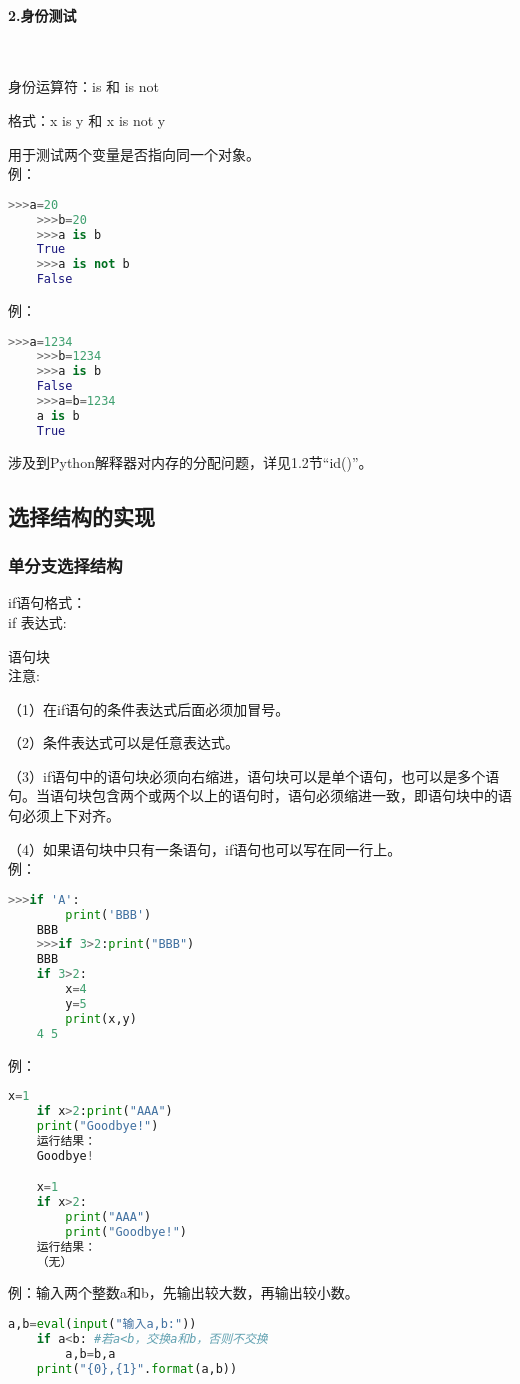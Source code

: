 \documentclass[11pt,a4paper]{article}
\begin{document}
\paragraph{2.身份测试}~{}

身份运算符：is 和 is not

格式：x is y 和 x is not y

用于测试两个变量是否指向同一个对象。\\
例：
\begin{lstlisting}[language={Python}]
    >>>a=20
    >>>b=20
    >>>a is b
    True
    >>>a is not b
    False
\end{lstlisting}
例：
\begin{lstlisting}[language={Python}]
    >>>a=1234
    >>>b=1234
    >>>a is b
    False
    >>>a=b=1234
    a is b
    True
\end{lstlisting}
涉及到Python解释器对内存的分配问题，详见1.2节“id()”。

\subsection{选择结构的实现}

\subsubsection{单分支选择结构}

if语句格式：\\
if 表达式:

语句块\\
注意:

（1）在if语句的条件表达式后面必须加冒号。

（2）条件表达式可以是任意表达式。

（3）if语句中的语句块必须向右缩进，语句块可以是单个语句，也可以是多个语句。当语句块包含两个或两个以上的语句时，语句必须缩进一致，即语句块中的语句必须上下对齐。

（4）如果语句块中只有一条语句，if语句也可以写在同一行上。\\
例：
\begin{lstlisting}[language={Python}]
    >>>if 'A':
        print('BBB')
    BBB
    >>>if 3>2:print("BBB")
    BBB
    if 3>2:
        x=4
        y=5
        print(x,y)
    4 5
\end{lstlisting}
例：
\begin{lstlisting}[language={Python}]
    x=1
    if x>2:print("AAA")
    print("Goodbye!")
    运行结果：
    Goodbye!

    x=1
    if x>2:
        print("AAA")
        print("Goodbye!")
    运行结果：
    （无）
\end{lstlisting}
例：输入两个整数a和b，先输出较大数，再输出较小数。
\begin{lstlisting}[language={Python}]
    a,b=eval(input("输入a,b:"))
    if a<b: #若a<b，交换a和b，否则不交换
        a,b=b,a
    print("{0},{1}".format(a,b))
\end{lstlisting}
\end{document}
